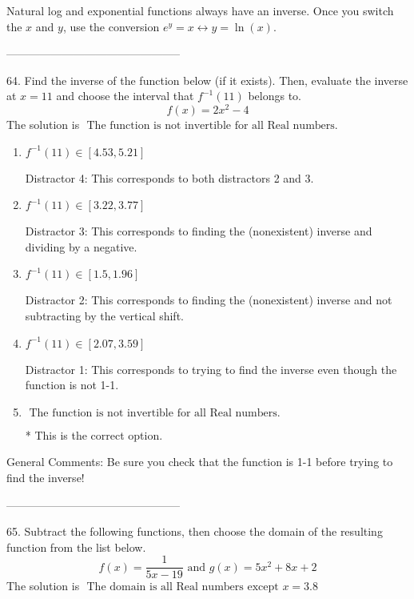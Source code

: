\documentclass{extbook}[14pt]
\begin{document}
Natural log and exponential functions always have an inverse. Once you switch the $x$ and $y$, use the conversion $ e^y = x \leftrightarrow y=\ln(x)$.

-----------------------------------------------

64. Find the inverse of the function below (if it exists). Then, evaluate the inverse at $x = 11$ and choose the interval that $f^{-1}(11)$ belongs to.
\[ f(x) = 2 x^2 - 4 \] 
The solution is $ \text{ The function is not invertible for all Real numbers. } $ 

\begin{enumerate}[label=\Alph*.] 
\item $ f^{-1}(11) \in [4.53, 5.21] $ 

  Distractor 4: This corresponds to both distractors 2 and 3. 
\item $ f^{-1}(11) \in [3.22, 3.77] $ 

  Distractor 3: This corresponds to finding the (nonexistent) inverse and dividing by a negative. 
\item $ f^{-1}(11) \in [1.5, 1.96] $ 

  Distractor 2: This corresponds to finding the (nonexistent) inverse and not subtracting by the vertical shift. 
\item $ f^{-1}(11) \in [2.07, 3.59] $ 

  Distractor 1: This corresponds to trying to find the inverse even though the function is not 1-1.  
\item $ \text{ The function is not invertible for all Real numbers. } $ 

 * This is the correct option. 
\end{enumerate} 
 
General Comments: Be sure you check that the function is 1-1 before trying to find the inverse!

-----------------------------------------------

65. Subtract the following functions, then choose the domain of the resulting function from the list below.
\[ f(x) = \frac{1}{5x-19} \text{ and } g(x) = 5x^{2} +8 x + 2 \] 
The solution is $ \text{ The domain is all Real numbers except } x = 3.8 $ 
\end{document}
